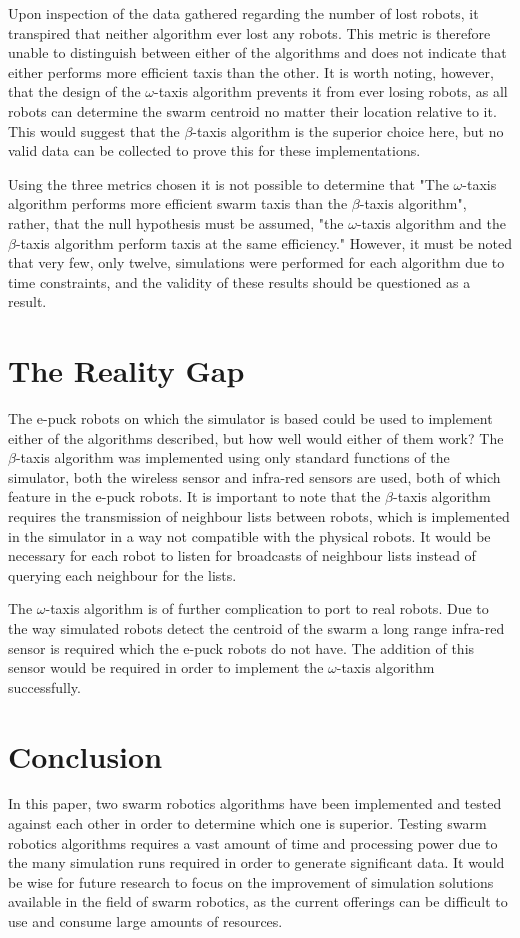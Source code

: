 \documentclass[conference]{IEEEtran}
\begin{document}
Upon inspection of the data gathered regarding the number of lost robots, it transpired that neither algorithm ever lost any robots. This metric is therefore unable to distinguish between either of the algorithms and does not indicate that either performs more efficient taxis than the other. It is worth noting, however, that the design of the $\omega$-taxis algorithm prevents it from ever losing robots, as all robots can determine the swarm centroid no matter their location relative to it. This would suggest that the $\beta$-taxis algorithm is the superior choice here, but no valid data can be collected to prove this for these implementations.

Using the three metrics chosen it is not possible to determine that "The $\omega$-taxis algorithm performs more efficient swarm taxis than the $\beta$-taxis algorithm", rather, that the null hypothesis must be assumed, "the $\omega$-taxis algorithm and the $\beta$-taxis algorithm perform taxis at the same efficiency." However, it must be noted that very few, only twelve, simulations were performed for each algorithm due to time constraints, and the validity of these results should be questioned as a result.

\section{The Reality Gap}

The e-puck robots on which the simulator is based could be used to implement either of the algorithms described, but how well would either of them work? The $\beta$-taxis algorithm was implemented using only standard functions of the simulator, both the wireless sensor and infra-red sensors are used, both of which feature in the e-puck robots. It is important to note that the $\beta$-taxis algorithm requires the transmission of neighbour lists between robots, which is implemented in the simulator in a way not compatible with the physical robots. It would be necessary for each robot to listen for broadcasts of neighbour lists instead of querying each neighbour for the lists. 

The $\omega$-taxis algorithm is of further complication to port to real robots. Due to the way simulated robots detect the centroid of the swarm a long range infra-red sensor is required which the e-puck robots do not have. The addition of this sensor would be required in order to implement the $\omega$-taxis algorithm successfully.

\section{Conclusion}
In this paper, two swarm robotics algorithms have been implemented and tested against each other in order to determine which one is superior. Testing swarm robotics algorithms requires a vast amount of time and processing power due to the many simulation runs required in order to generate significant data. It would be wise for future research to focus on the improvement of simulation solutions available in the field of swarm robotics, as the current offerings can be difficult to use and consume large amounts of resources.
\end{document}
